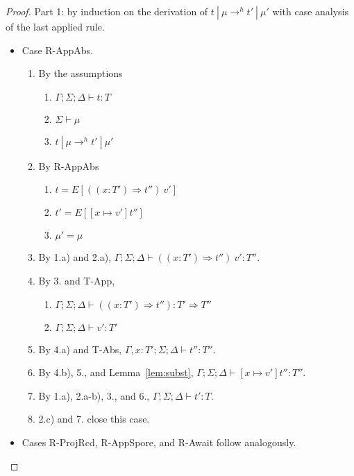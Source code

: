 \begin{proof}

Part 1: by induction on the derivation of $t~|~\mu \rightarrow^h t'~|~\mu'$ with case analysis of the last applied rule.

\begin{itemize}
\item Case R-AppAbs.
\begin{enumerate}
\item By the assumptions
  \begin{enumerate}[label=(\alph*)]
  \item $\Gamma ; \Sigma ; \Delta \vdash t : T$
  \item $\Sigma \vdash \mu$
  \item $t~|~\mu \rightarrow^h t'~|~\mu'$
  \end{enumerate}
\item By R-AppAbs
  \begin{enumerate}[label=(\alph*)]
  \item $t = E[((x : T') \Rightarrow t'')~v']$
  \item $t' = E[[x \mapsto v']t'']$
  \item $\mu' = \mu$
  \end{enumerate}
\item By 1.a) and 2.a), $\Gamma ; \Sigma ; \Delta \vdash ((x : T') \Rightarrow t'')~v' : T''$.
\item By 3. and T-App,
  \begin{enumerate}[label=(\alph*)]
  \item $\Gamma ; \Sigma ; \Delta \vdash ((x : T') \Rightarrow t'') : T' \Rightarrow T''$
  \item $\Gamma ; \Sigma ; \Delta \vdash v' : T'$
  \end{enumerate}
\item By 4.a) and T-Abs, $\Gamma , x : T' ; \Sigma ; \Delta \vdash t'' : T''$.
\item By 4.b), 5., and Lemma~\ref{lem:subst}, $\Gamma ; \Sigma ; \Delta \vdash [x \mapsto v']t'' : T''$.
\item By 1.a), 2.a-b), 3., and 6., $\Gamma ; \Sigma ; \Delta \vdash t' : T$.
\item 2.c) and 7. close this case.
\end{enumerate}

\item Cases R-ProjRcd, R-AppSpore, and R-Await follow analogously.


\end{itemize}
\end{proof}
